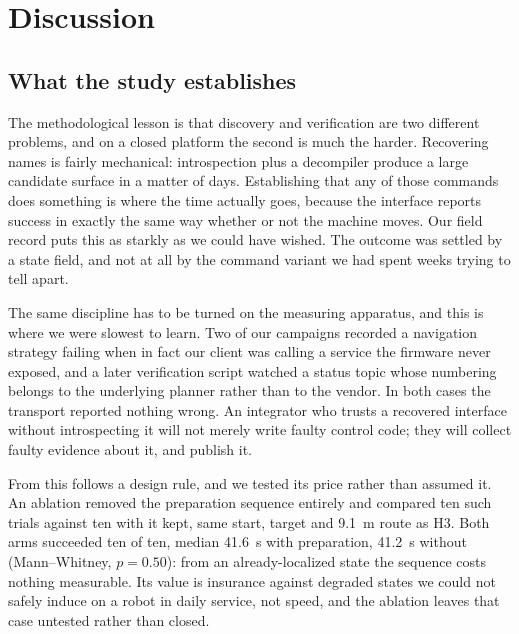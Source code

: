 
\section{Discussion}
\label{sec:discussion}

\subsection{What the study establishes}

The methodological lesson is that discovery and verification are two different problems, and on
a closed platform the second is much the harder. Recovering names is fairly mechanical:
introspection plus a decompiler produce a large candidate surface in a matter of days.
Establishing that any of those commands does something is where the time actually goes, because
the interface reports success in exactly the same way whether or not the machine moves. Our
field record puts this as starkly as we could have wished. The outcome was settled by a state
field, and not at all by the command variant we had spent weeks trying to tell apart.

The same discipline has to be turned on the measuring apparatus, and this is where we were
slowest to learn. Two of our campaigns recorded a navigation strategy failing when in fact our
client was calling a service the firmware never exposed, and a later verification script watched
a status topic whose numbering belongs to the underlying planner rather than to the vendor. In
both cases the transport reported nothing wrong. An integrator who trusts a recovered interface
without introspecting it will not merely write faulty control code; they will collect faulty
evidence about it, and publish it.

From this follows a design rule, and we tested its price rather than assumed it. An ablation
removed the preparation sequence entirely and compared ten such trials against ten with it kept,
same start, target and \SI{9.1}{\meter} route as H3. Both arms succeeded ten of ten, median
\SI{41.6}{\second} with preparation, \SI{41.2}{\second} without (Mann--Whitney, $p=0.50$): from an
already-localized state the sequence costs nothing measurable. Its value is insurance against
degraded states we could not safely induce on a robot in daily service, not speed, and the
ablation leaves that case untested rather than closed.


